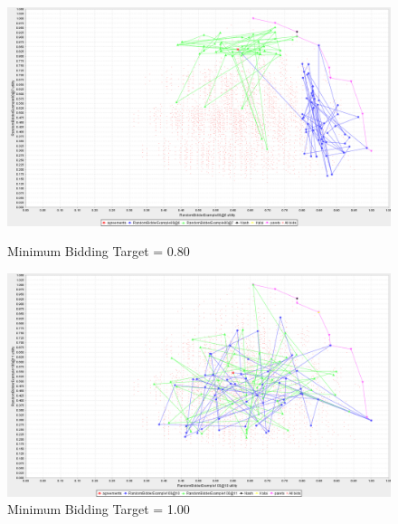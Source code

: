 \documentclass{article}
\begin{document}
\begin{enumerate}[label=(\alph*)]
\begin{figure}[ht]
  \includegraphics[width=\linewidth]{imgs/rb_80}
  \caption{Minimum Bidding Target = 0.80}
  \endminipage\hfill
  \includegraphics[width=\linewidth]{imgs/rb_100}
  \caption{Minimum Bidding Target = 1.00}
  \endminipage\hfill
\end{figure}

\end{enumerate} %
\end{document}
